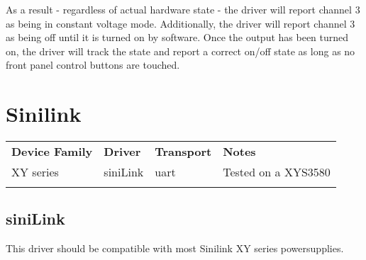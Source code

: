 As a result - regardless of actual hardware state - the driver will report channel 3 as being in constant voltage mode.
Additionally, the driver will report channel 3 as being off until it is turned on by software. Once the output has been
turned on, the driver will track the state and report a correct on/off state as long as no front panel control buttons
are touched.

\section{Sinilink}

\begin{tabularx}{16cm}{lllX}
\thickhline
\textbf{Device Family} & \textbf{Driver} & \textbf{Transport} & \textbf{Notes} \\
\thickhline
XY series & siniLink & uart & Tested on a XYS3580\\
\thickhline
\end{tabularx}

\subsection{siniLink}

This driver should be compatible with most Sinilink XY series powersupplies.
